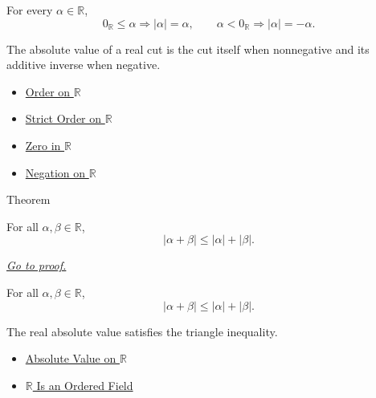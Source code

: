 \begin{remark*}
For every $\alpha\in\mathbb{R}$,
\[
0_{\mathbb{R}}\le\alpha\Longrightarrow |\alpha|=\alpha,
\qquad
\alpha<0_{\mathbb{R}}\Longrightarrow |\alpha|=-\alpha.
\]
\end{remark*}

\begin{remark*}[Interpretation]
The absolute value of a real cut is the cut itself when nonnegative and its
additive inverse when negative.
\end{remark*}

\begin{dependencies}
\begin{itemize}
  \item \hyperref[def:order-on-r]{Order on $\mathbb{R}$}
  \item \hyperref[def:strict-order-on-r]{Strict Order on $\mathbb{R}$}
  \item \hyperref[def:zero-in-r]{Zero in $\mathbb{R}$}
  \item \hyperref[def:negation-on-r]{Negation on $\mathbb{R}$}
\end{itemize}
\end{dependencies}

\begin{theorembox}{Theorem}
\begin{theorem}
\label{thm:triangle-inequality}
For all $\alpha,\beta\in\mathbb{R}$,
\[
|\alpha+\beta|\le |\alpha|+|\beta|.
\]

\smallskip\noindent
\hyperref[prf:triangle-inequality]{\textit{Go to proof.}}
\end{theorem}
\end{theorembox}

\begin{remark*}
For all $\alpha,\beta\in\mathbb{R}$,
\[
|\alpha+\beta|\le |\alpha|+|\beta|.
\]
\end{remark*}

\begin{remark*}[Interpretation]
The real absolute value satisfies the triangle inequality.
\end{remark*}

\begin{dependencies}
\begin{itemize}
  \item \hyperref[def:real-chapter-absolute-value-on-r]{Absolute Value on $\mathbb{R}$}
  \item \hyperref[thm:r-is-an-ordered-field]{$\mathbb{R}$ Is an Ordered Field}
\end{itemize}
\end{dependencies}

